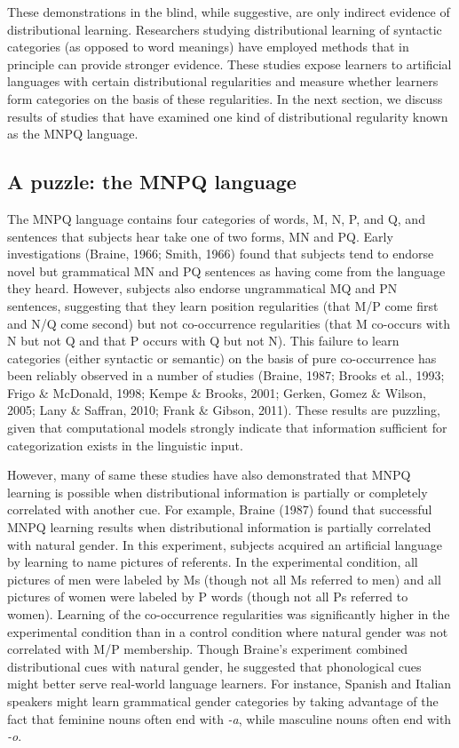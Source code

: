 \documentclass[man,floatsintext]{apa6}
\begin{document}
These demonstrations in the blind, while suggestive, are only indirect evidence of distributional learning. Researchers studying distributional learning of syntactic categories (as opposed to word meanings) have employed methods that in principle can provide stronger evidence. These studies expose learners to artificial languages with certain distributional regularities and measure whether learners form categories on the basis of these regularities. In the next section, we discuss results of studies that have examined one kind of distributional regularity known as the MNPQ language.

\subsection{A puzzle: the MNPQ language}

The MNPQ language contains four categories of words, M, N, P, and Q, and sentences that subjects hear take one of two forms, MN and PQ. Early investigations (Braine, 1966; Smith, 1966) found that subjects tend to endorse novel but grammatical MN and PQ sentences as having come from the language they heard. However, subjects also endorse ungrammatical MQ and PN sentences, suggesting that they learn position regularities (that M/P come first and N/Q come second) but not co-occurrence regularities (that M co-occurs with N but not Q and that P occurs with Q but not N). This failure to learn categories (either syntactic or semantic) on the basis of pure co-occurrence has been reliably observed in a number of studies (Braine, 1987; Brooks et al., 1993; Frigo \& McDonald, 1998; Kempe \& Brooks, 2001; Gerken, Gomez \& Wilson, 2005; Lany \& Saffran, 2010; Frank \& Gibson, 2011). These results are puzzling, given that computational models strongly indicate that information sufficient for categorization exists in the linguistic input.

However, many of same these studies have also demonstrated that MNPQ learning is possible when distributional information is partially or completely correlated with another cue. For example, Braine (1987) found that successful MNPQ learning results when distributional information is partially correlated with natural gender. In this experiment, subjects acquired an artificial language by learning to name pictures of referents. In the experimental condition, all pictures of men were labeled by Ms (though not all Ms referred to men) and all pictures of women were labeled by P words (though not all Ps referred to women). Learning of the co-occurrence regularities was significantly higher in the experimental condition than in a control condition where natural gender was not correlated with M/P membership. Though Braine's experiment combined distributional cues with natural gender, he suggested that phonological cues might better serve real-world language learners. For instance, Spanish and Italian speakers might learn grammatical gender categories by taking advantage of the fact that feminine nouns often end with \emph{-a}, while masculine nouns often end with \emph{-o}.
\end{document}
